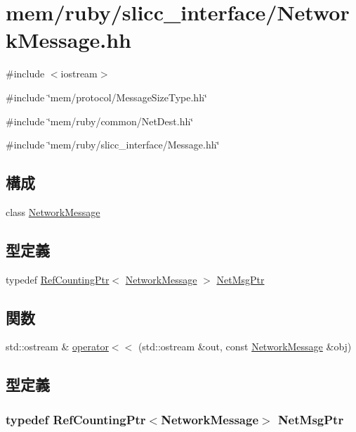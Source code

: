 \hypertarget{NetworkMessage_8hh}{
\section{mem/ruby/slicc\_\-interface/NetworkMessage.hh}
\label{NetworkMessage_8hh}
}
{\ttfamily \#include $<$iostream$>$}\par
{\ttfamily \#include \char`\"{}mem/protocol/MessageSizeType.hh\char`\"{}}\par
{\ttfamily \#include \char`\"{}mem/ruby/common/NetDest.hh\char`\"{}}\par
{\ttfamily \#include \char`\"{}mem/ruby/slicc\_\-interface/Message.hh\char`\"{}}\par
\subsection*{構成}
\begin{DoxyCompactItemize}
\item 
class \hyperlink{classNetworkMessage}{NetworkMessage}
\end{DoxyCompactItemize}
\subsection*{型定義}
\begin{DoxyCompactItemize}
\item 
typedef \hyperlink{classRefCountingPtr}{RefCountingPtr}$<$ \hyperlink{classNetworkMessage}{NetworkMessage} $>$ \hyperlink{NetworkMessage_8hh_a812362837f0211e7989c5a2975a4e303}{NetMsgPtr}
\end{DoxyCompactItemize}
\subsection*{関数}
\begin{DoxyCompactItemize}
\item 
std::ostream \& \hyperlink{NetworkMessage_8hh_a5d0e888647d1237a9e60cb70a456f466}{operator$<$$<$} (std::ostream \&out, const \hyperlink{classNetworkMessage}{NetworkMessage} \&obj)
\end{DoxyCompactItemize}


\subsection{型定義}
\hypertarget{NetworkMessage_8hh_a812362837f0211e7989c5a2975a4e303}{
\subsubsection[{NetMsgPtr}]{\setlength{\rightskip}{0pt plus 5cm}typedef {\bf RefCountingPtr}$<${\bf NetworkMessage}$>$ {\bf NetMsgPtr}}}
\label{NetworkMessage_8hh_a812362837f0211e7989c5a2975a4e303}


